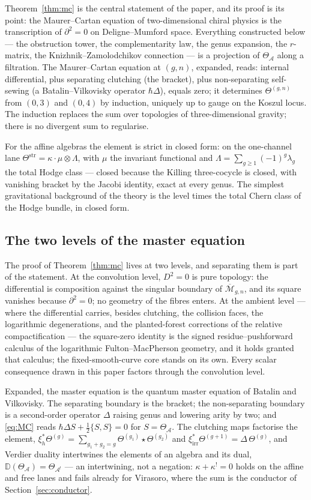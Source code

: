 \documentclass[11pt]{amsart}
\numberwithin{equation}{section}
\theoremstyle{plain}
\theoremstyle{definition}
\theoremstyle{remark}
\newcommand{\cA}{\mathcal{A}}
\newcommand{\cM}{\mathcal{M}}
\newcommand{\Mbar}{\overline{\cM}}
\begin{document}
Theorem~\ref{thm:mc} is the central statement of the paper, and its proof
is its point: the Maurer--Cartan equation of two-dimensional chiral
physics is the transcription of $\partial^{2}=0$ on Deligne--Mumford
space. Everything constructed below --- the obstruction tower, the
complementarity law, the genus expansion, the $r$-matrix, the
Knizhnik--Zamolodchikov connection --- is a projection of
$\Theta_{\cA}$ along a filtration. The Maurer--Cartan equation at
$(g,n)$, expanded, reads: internal differential, plus separating
clutching (the bracket), plus non-separating self-sewing (a
Batalin--Vilkovisky operator $\hbar\Delta$), equals zero; it determines
$\Theta^{(g,n)}$ from $(0,3)$ and $(0,4)$ by induction, uniquely up to
gauge on the Koszul locus. The induction replaces the sum over
topologies of three-dimensional gravity; there is no divergent sum to
regularise.

For the affine algebras the element is strict in closed form: on the
one-channel lane $\Theta^{\mathrm{str}}=\kappa\cdot\mu\otimes\Lambda$,
with $\mu$ the invariant functional and
$\Lambda=\sum_{g\geq1}(-1)^{g}\lambda_g$ the total Hodge class ---
closed because the Killing three-cocycle is closed, with vanishing
bracket by the Jacobi identity, exact at every genus.
The simplest gravitational background of the theory is the level
times the total Chern class of the Hodge bundle, in closed form.

\subsection{The two levels of the master equation}

The proof of Theorem~\ref{thm:mc} lives at two levels, and separating
them is part of the statement. At the convolution level, $D^{2}=0$ is
pure topology: the differential is composition against the singular
boundary of $\Mbar_{g,n}$, and its square vanishes because
$\partial^{2}=0$; no geometry of the fibres enters. At the ambient
level --- where the differential carries, besides clutching, the
collision faces, the logarithmic degenerations, and the planted-forest
corrections of the relative compactification --- the square-zero
identity is the signed residue--pushforward calculus of the
logarithmic Fulton--MacPherson geometry, and it holds granted that
calculus; the fixed-smooth-curve core stands on its own. Every scalar
consequence drawn in this paper factors through the convolution
level.

Expanded, the master equation is the quantum master equation of
Batalin and Vilkovisky. The separating boundary is the bracket; the
non-separating boundary is a second-order operator $\Delta$ raising
genus and lowering arity by two; and \eqref{eq:MC} reads
$\hbar\Delta S+\tfrac12\{S,S\}=0$ for $S=\Theta_{\cA}$. The clutching
maps factorise the element,
$\xi_{h}^{*}\Theta^{(g)}=\sum_{g_1+g_2=g}
\Theta^{(g_1)}\star\Theta^{(g_2)}$ and
$\xi_{\mathrm{irr}}^{*}\Theta^{(g+1)}=\Delta\,\Theta^{(g)}$, and
Verdier duality intertwines the elements of an algebra and its dual,
$\mathbb{D}(\Theta_{\cA})=\Theta_{\cA^{!}}$ --- an intertwining, not a
negation: $\kappa+\kappa^{!}=0$ holds on the affine and free lanes and
fails already for Virasoro, where the sum is the conductor of
Section~\ref{sec:conductor}.
\end{document}
